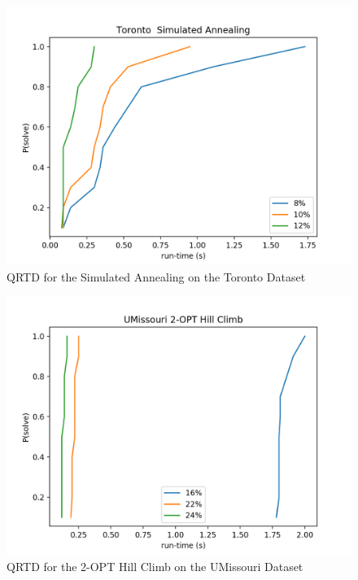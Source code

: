 \documentclass[format=sigconf]{acmart}
\begin{document}
\begin{figure}[htbp]
    \centerline{\includegraphics[scale=.5]{graphs/Toronto_LS2_QRTD.png}}
    \caption{QRTD for the Simulated Annealing on the Toronto Dataset}
    \label{fig2}
\end{figure}

\begin{figure}[htbp]
    \centerline{\includegraphics[scale=.5]{graphs/UMissouri_LS1_QRTD.png}}
    \caption{QRTD for the 2-OPT Hill Climb on the UMissouri Dataset}
    \label{fig3}
\end{figure}
\end{document}
